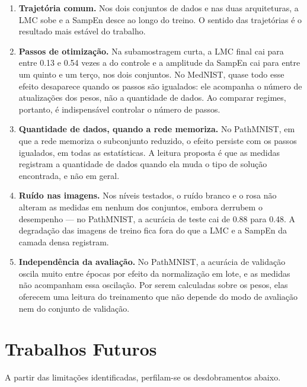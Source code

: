 \begin{enumerate}
  \item \textbf{Trajetória comum.} Nos dois conjuntos de dados e nas duas
  arquiteturas, a LMC sobe e a SampEn desce ao longo do treino. O sentido das
  trajetórias é o resultado mais estável do trabalho.

  \item \textbf{Passos de otimização.} Na subamostragem curta, a LMC final
  cai para entre \num{0,13} e \num{0,54} vezes a do controle e a amplitude da
  SampEn cai para entre um quinto e um terço, nos dois conjuntos. No MedNIST,
  quase todo esse efeito desaparece quando os passos são igualados: ele
  acompanha o número de atualizações dos pesos, não a quantidade de dados. Ao
  comparar regimes, portanto, é indispensável controlar o número de passos.

  \item \textbf{Quantidade de dados, quando a rede memoriza.} No PathMNIST,
  em que a rede memoriza o subconjunto reduzido, o efeito persiste com os
  passos igualados, em todas as estatísticas. A leitura proposta é que as
  medidas registram a quantidade de dados quando ela muda o tipo de solução
  encontrada, e não em geral.

  \item \textbf{Ruído nas imagens.} Nos níveis testados, o ruído branco e o
  rosa não alteram as medidas em nenhum dos conjuntos, embora derrubem o
  desempenho --- no PathMNIST, a acurácia de teste cai de \num{0,88} para
  \num{0,48}. A degradação das imagens de treino fica fora do que a LMC e a
  SampEn da camada densa registram.

  \item \textbf{Independência da avaliação.} No PathMNIST, a acurácia de
  validação oscila muito entre épocas por efeito da normalização em lote, e as
  medidas não acompanham essa oscilação. Por serem calculadas sobre os pesos,
  elas oferecem uma leitura do treinamento que não depende do modo de
  avaliação nem do conjunto de validação.
\end{enumerate}

\section{Trabalhos Futuros}
\label{sec:futuros}

A partir das limitações identificadas, perfilam-se os desdobramentos abaixo.

